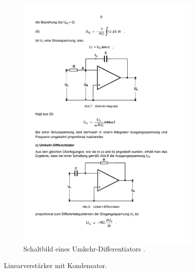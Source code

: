 \begin{figure}
\begin{subfigure}{.49\linewidth}
        \includegraphics[width=1.0\linewidth]{img/differentiator.pdf}
        \caption{Schaltbild eines Umkehr-Differentiators \cite{V51}.}
        \label{fig:integrator-differentiator}
    \end{subfigure}
    \caption{Linearverstärker mit Kondensator.}
    \label{fig:integrator}
\end{figure}

